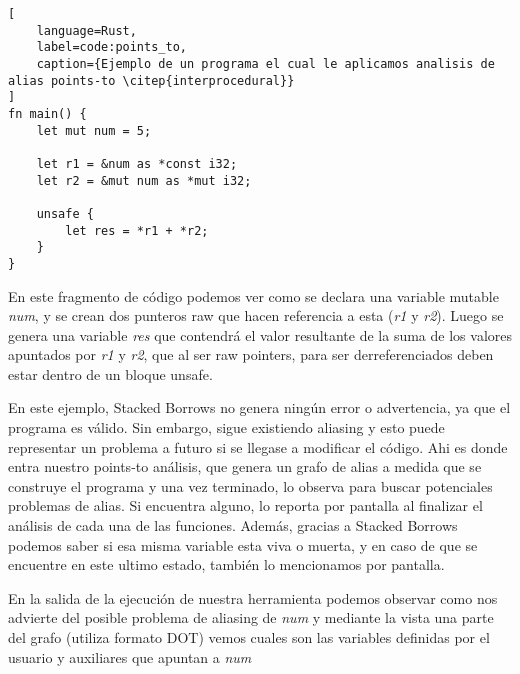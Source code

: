 \begin{lstlisting}[
    language=Rust,
    label=code:points_to,
    caption={Ejemplo de un programa el cual le aplicamos analisis de alias points-to \citep{interprocedural}}
]
fn main() {
    let mut num = 5;

    let r1 = &num as *const i32;
    let r2 = &mut num as *mut i32;

    unsafe {
        let res = *r1 + *r2;
    }
}
\end{lstlisting}

En este fragmento de código podemos ver como se declara una variable mutable \textit{num}, y se crean dos punteros raw que hacen referencia a esta (\textit{r1} y \textit{r2}). Luego se genera una variable \textit{res} que contendrá el valor resultante de la suma de los valores apuntados por \textit{r1} y \textit{r2}, que al ser raw pointers, para ser derreferenciados deben estar dentro de un bloque unsafe.

En este ejemplo, Stacked Borrows no genera ningún error o advertencia, ya que el programa es válido. Sin embargo, sigue existiendo aliasing y esto puede representar un problema a futuro si se llegase a modificar el código. Ahi es donde entra nuestro points-to análisis, que genera un grafo de alias a medida que se construye el programa y una vez terminado, lo observa para buscar potenciales problemas de alias. Si encuentra alguno, lo reporta por pantalla al finalizar el análisis de cada una de las funciones. Además, gracias a Stacked Borrows podemos saber si esa misma variable esta viva o muerta, y en caso de que se encuentre en este ultimo estado, también lo mencionamos por pantalla.

En la salida de la ejecución de nuestra herramienta podemos observar como nos advierte del posible problema de aliasing de \textit{num} y mediante la vista una parte del grafo (utiliza formato DOT) vemos cuales son las variables definidas por el usuario y auxiliares que apuntan a \textit{num}


